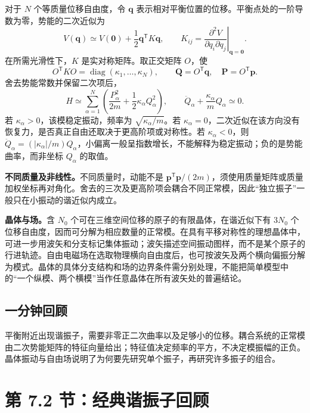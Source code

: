 对于 $N$ 个等质量位移自由度，令 $\mathbf q$ 表示相对平衡位置的位移。平衡点处的一阶导数为零，势能的二次近似为
\begin{equation}
  V(\mathbf q)\simeq V(\mathbf0)+\frac12\mathbf q^{\mathsf T}K\mathbf q,
  \qquad
  K_{ij}=\left.\frac{\partial^2V}{\partial q_i\partial q_j}\right|_{\mathbf q=\mathbf0}.
\end{equation}
在所需光滑性下，$K$ 是实对称矩阵。取正交矩阵 $O$，使
\begin{equation}
  O^{\mathsf T}KO=\operatorname{diag}(\kappa_1,\ldots,\kappa_N),
  \qquad \mathbf Q=O^{\mathsf T}\mathbf q,\quad
  \mathbf P=O^{\mathsf T}\mathbf p.
\end{equation}
舍去势能常数并保留二次项后，
\begin{equation}
  H\simeq\sum_{\alpha=1}^{N}
     \left(\frac{P_\alpha^2}{2m}+\frac12\kappa_\alpha Q_\alpha^2\right),
  \qquad
  \ddot Q_\alpha+\frac{\kappa_\alpha}{m}Q_\alpha\simeq0.
  \label{eq:QM-C07-S01-general-modes}
\end{equation}
若 $\kappa_\alpha>0$，该模稳定振动，频率为 $\sqrt{\kappa_\alpha/m}$。若 $\kappa_\alpha=0$，二次近似在该方向没有恢复力，是否真正自由还取决于更高阶项或对称性。若 $\kappa_\alpha<0$，则 $\ddot Q_\alpha=(|\kappa_\alpha|/m)Q_\alpha$，小偏离一般呈指数增长，不能解释为稳定振动；负的是势能曲率，而非坐标 $Q_\alpha$ 的取值。

\textbf{不同质量及非线性。}不同质量时，动能不是 $\mathbf p^{\mathsf T}\mathbf p/(2m)$，须使用质量矩阵或质量加权坐标再对角化。舍去的三次及更高阶项会耦合不同正常模，因此“独立振子”一般只在小振动的谐近似内成立。

\textbf{晶体与场。}含 $N_0$ 个可在三维空间位移的原子的有限晶体，在谐近似下有 $3N_0$ 个位移自由度，因而可分解为相应数量的正常模。在具有平移对称性的理想晶体中，可进一步用波矢和分支标记集体振动；波矢描述空间振动图样，而不是某个原子的行进轨迹。自由电磁场在选取物理横向自由度后，也可按波矢及两个横向偏振分解为模式。晶体的具体分支结构和场的边界条件需分别处理，不能把简单模型中的“一个纵模、两个横模”当作任意晶体在所有波矢处的普遍结论。

\subsection{一分钟回顾}
平衡附近出现谐振子，需要非零正二次曲率以及足够小的位移。耦合系统的正常模由二次势能矩阵的特征向量给出；特征值决定频率的平方，不决定模振幅的正负。晶体振动与自由场说明了为何要先研究单个振子，再研究许多振子的组合。

\section{第 7.2 节：经典谐振子回顾}
\label{section:QM-C07-S02}


